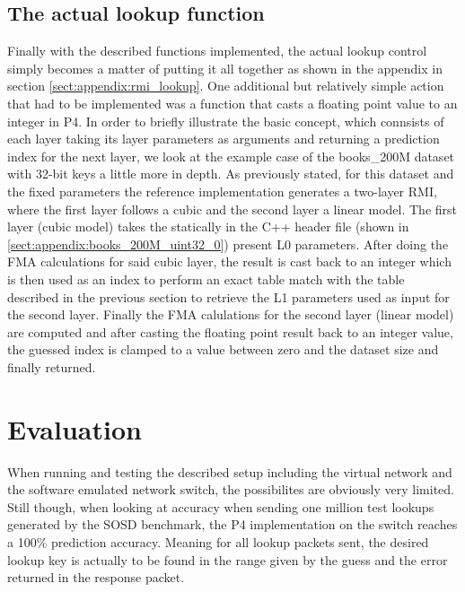\subsection{The actual lookup function}
Finally with the described functions implemented, the actual lookup control simply becomes a matter of putting it all together as shown in the appendix in section \ref{sect:appendix:rmi_lookup}. One additional but relatively simple action that had to be implemented was a function that casts a floating point value to an integer in P4. In order to briefly illustrate the basic concept, which connsists of each layer taking its layer parameters as arguments and returning a prediction index for the next layer, we look at the example case of the books\_200M dataset with 32-bit keys a little more in depth. As previously stated, for this dataset and the fixed parameters the reference implementation generates a two-layer RMI, where the first layer follows a cubic and the second layer a linear model. The first layer (cubic model) takes the statically in the C++ header file (shown in \ref{sect:appendix:books_200M_uint32_0}) present L0 parameters. After doing the FMA calculations for said cubic layer, the result is cast back to an integer which is then used as an index to perform an exact table match with the table described in the previous section to retrieve the L1 parameters used as input for the second layer. Finally the FMA calulations for the second layer (linear model) are computed and after casting the floating point result back to an integer value, the guessed index is clamped to a value between zero and the dataset size and finally returned.

\section{Evaluation}
\label{sect:rmionbmv2:evaluation}
When running and testing the described setup including the virtual network and the software emulated network switch, the possibilites are obviously very limited. Still though, when looking at accuracy when sending one million test lookups generated by the SOSD benchmark, the P4 implementation on the switch reaches a 100\% prediction accuracy. Meaning for all lookup packets sent, the desired lookup key is actually to be found in the range given by the guess and the error returned in the response packet.\\

